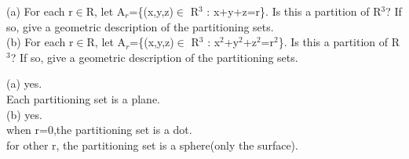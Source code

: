 \documentclass[11pt, a4paper, UTF8]{ctexart}
\begin{document}
\begin{problem}[UD:11.3]
(a) For each r$\in$R, let A$_r$=\{(x,y,z)$\in$ R$^3$ : x+y+z=r\}. Is this a partition of R$^3$? If so, give a geometric description of the partitioning sets.\\
(b) For each r$\in$R, let A$_r$=\{(x,y,z)$\in$ R$^3$ : x$^2$+y$^2$+z$^2$=r$^2$\}. Is this a partition of R$^3$? If so, give a geometric description of the partitioning sets.\\
\end{problem}
\begin{solution}
(a) yes.\\
Each partitioning set is a plane.\\
(b) yes.\\
when r=0,the partitioning set is a dot.\\
for other r, the partitioning set is a sphere(only the surface).
\end{solution}
\end{document}
